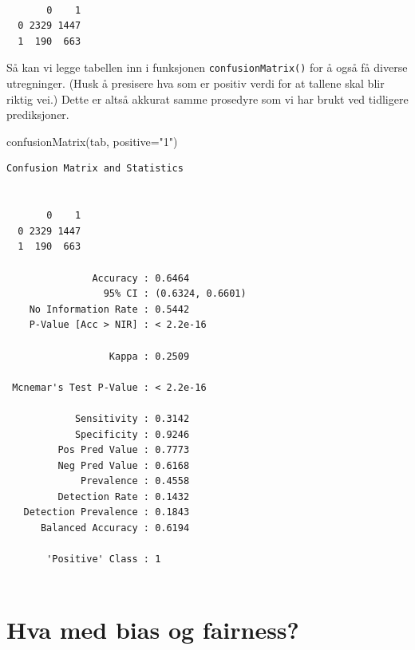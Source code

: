 \documentclass[
  letterpaper,
  DIV=11,
  numbers=noendperiod]{scrreprt}
\newenvironment{Shaded}{\begin{snugshade}}{\end{snugshade}}
\newcommand{\AttributeTok}[1]{\textcolor[rgb]{0.40,0.45,0.13}{#1}}
\newcommand{\FunctionTok}[1]{\textcolor[rgb]{0.28,0.35,0.67}{#1}}
\newcommand{\NormalTok}[1]{\textcolor[rgb]{0.00,0.23,0.31}{#1}}
\newcommand{\StringTok}[1]{\textcolor[rgb]{0.13,0.47,0.30}{#1}}
\begin{document}
\begin{verbatim}
   
       0    1
  0 2329 1447
  1  190  663
\end{verbatim}

Så kan vi legge tabellen inn i funksjonen \texttt{confusionMatrix()} for
å også få diverse utregninger. (Husk å presisere hva som er positiv
verdi for at tallene skal blir riktig vei.) Dette er altså akkurat samme
prosedyre som vi har brukt ved tidligere prediksjoner.

\begin{Shaded}
\begin{Highlighting}[]
\FunctionTok{confusionMatrix}\NormalTok{(tab, }\AttributeTok{positive=}\StringTok{"1"}\NormalTok{)}
\end{Highlighting}
\end{Shaded}

\begin{verbatim}
Confusion Matrix and Statistics

   
       0    1
  0 2329 1447
  1  190  663
                                          
               Accuracy : 0.6464          
                 95% CI : (0.6324, 0.6601)
    No Information Rate : 0.5442          
    P-Value [Acc > NIR] : < 2.2e-16       
                                          
                  Kappa : 0.2509          
                                          
 Mcnemar's Test P-Value : < 2.2e-16       
                                          
            Sensitivity : 0.3142          
            Specificity : 0.9246          
         Pos Pred Value : 0.7773          
         Neg Pred Value : 0.6168          
             Prevalence : 0.4558          
         Detection Rate : 0.1432          
   Detection Prevalence : 0.1843          
      Balanced Accuracy : 0.6194          
                                          
       'Positive' Class : 1               
                                          
\end{verbatim}

\section{Hva med bias og fairness?}\label{hva-med-bias-og-fairness}
\end{document}
